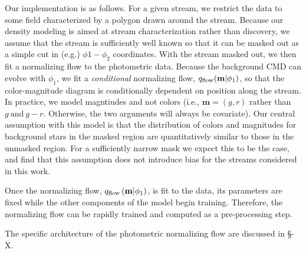 \documentclass[twocolumn]{aastex631}
\newcommand{\mbs}[1]{\boldsymbol{#1}}
\begin{document}
            Our implementation is as follows. For a given stream, we restrict the data to some field characterized by a polygon drawn around the stream. Because our density modeling is aimed at stream characterization rather than discovery, we assume that the stream is sufficiently well known so that it can be masked out as a simple cut in (e.g.) $\phi1-\phi_2$ coordinates. With the stream masked out, we then fit a normalizing flow to the photometric data. Because the background CMD can evolve with $\phi_1$, we fit a \emph{conditional} normalizing flow, $q_{\rm flow}(\mathbf{m}|\phi_1)$, so that the color-magnitude diagram is conditionally dependent on position along the stream. In practice, we model magntiudes and not colors (i.e., $\mathbf{m} = (g,r)$ rather than $g \ \mathrm{and} \ g-r$. Otherwise, the two arguments will always be covariate). Our central assumption with this model is that the distribution of colors and magnitudes for background stars in the masked region are quantitatively similar to those in the unmasked region. For a sufficiently narrow mask we expect this to be the case, and find that this assumption does not introduce bias for the streams considered in this work.
                
            Once the normalizing flow, $q_{\rm flow}\left(\mathbf{m} | \phi_1\right)$, is fit to the data, its parameters are fixed while the other components of the model begin training. Therefore, the normalizing flow can be rapidly trained and computed as a pre-processing step. 

            The specific architecture of the photometric normalizing flow are discussed in \S-X.

            



\end{document}
